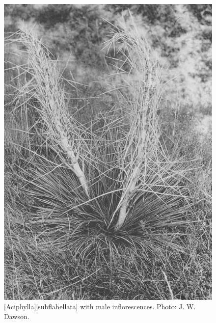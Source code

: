\begin{figure}[htb]
	\centering
	\begin{minipage}[t]{0.513\textwidth}
		\centering
		\includegraphics[width=\textwidth]{graphics/figure84aciphylla.jpg}
    	\caption[\emph{Aciphylla subflabellata with male inflorescencs}]{[Aciphylla][subflabellata] with male inflorescences.
    	Photo:  J. W. Dawson.}%
    	\label{fig:84aciphylla}
	\end{minipage}\hfill%
	\begin{minipage}[t]{0.467\textwidth}
    	\centering

\end{minipage}
\end{figure}
